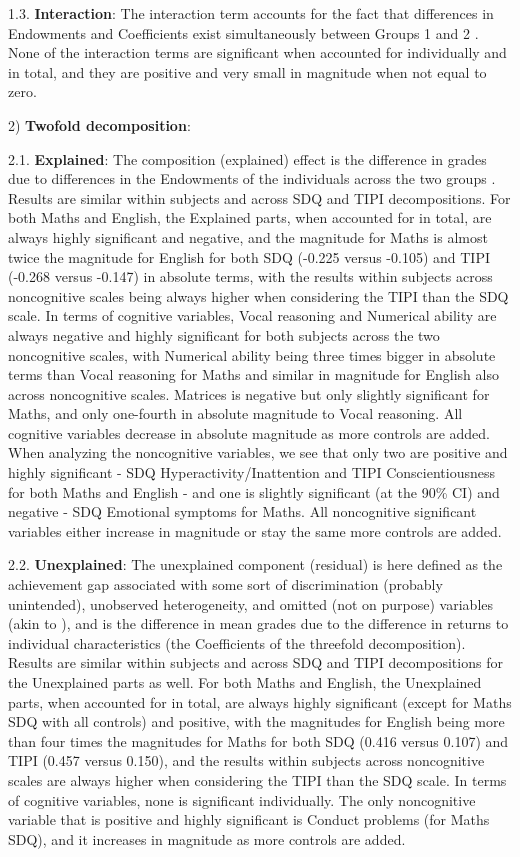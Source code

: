 \documentclass[12pt,a4paper,onecolumn]{article}
\numberwithin{equation}{section}
\begin{document}
1.3. \textbf{Interaction}: The interaction term accounts for the fact that differences in Endowments and Coefficients exist simultaneously between Groups 1 and 2 \parencite{jann2008}. None of the interaction terms are significant when accounted for individually and in total, and they are positive and very small in magnitude when not equal to zero.

2) \textbf{Twofold decomposition}: 

2.1. \textbf{Explained}: The composition (explained) effect is the difference in grades due to differences in the Endowments of the individuals across the two groups \parencite{popli2013}. Results are similar within subjects and across SDQ and TIPI decompositions. For both Maths and English, the Explained parts, when accounted for in total, are always highly significant and negative, and the magnitude for Maths is almost twice the magnitude for English for both SDQ (-0.225 versus -0.105) and TIPI (-0.268 versus -0.147) in absolute terms, with the results within subjects across noncognitive scales being always higher when considering the TIPI than the SDQ scale. In terms of cognitive variables, Vocal reasoning and Numerical ability are always negative and highly significant for both subjects across the two noncognitive scales, with Numerical ability being three times bigger in absolute terms than Vocal reasoning for Maths and similar in magnitude for English also across noncognitive scales. Matrices is negative but only slightly significant for Maths, and only one-fourth in absolute magnitude to Vocal reasoning. All cognitive variables decrease in absolute magnitude as more controls are added. When analyzing the noncognitive variables, we see that only two are positive and highly significant - SDQ Hyperactivity/Inattention and TIPI Conscientiousness for both Maths and English - and one is slightly significant (at the 90\% CI) and negative - SDQ Emotional symptoms for Maths. All noncognitive significant variables either increase in magnitude or stay the same more controls are added. 

2.2. \textbf{Unexplained}: The unexplained component (residual) is here defined as the achievement gap associated with some sort of discrimination (probably unintended), unobserved heterogeneity, and omitted (not on purpose) variables (akin to \parencite{popli2013}), and is the difference in mean grades due to the difference in returns to individual characteristics (the Coefficients of the threefold decomposition). Results are similar within subjects and across SDQ and TIPI decompositions for the Unexplained parts as well. For both Maths and English, the Unexplained parts, when accounted for in total, are always highly significant (except for Maths SDQ with all controls) and positive, with the magnitudes for English being more than four times the magnitudes for Maths for both SDQ (0.416 versus 0.107) and TIPI (0.457 versus 0.150), and the results within subjects across noncognitive scales are always higher when considering the TIPI than the SDQ scale. In terms of cognitive variables, none is significant individually. The only noncognitive variable that is positive and highly significant is Conduct problems (for Maths SDQ), and it increases in magnitude as more controls are added.
\end{document}
